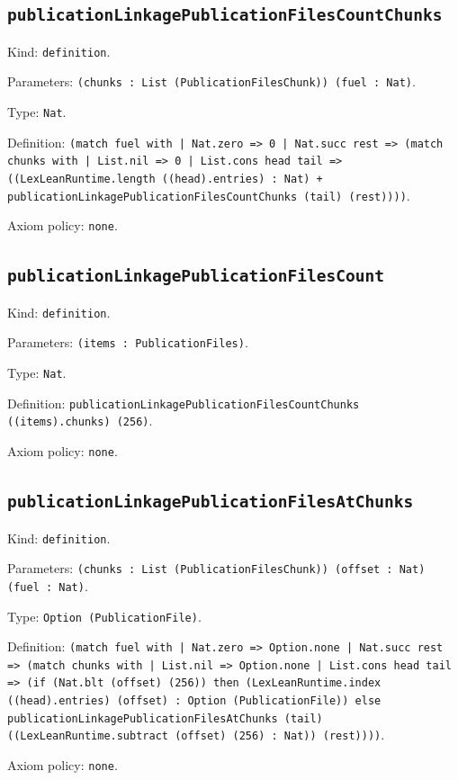 \documentclass[11pt]{article}
\begin{document}
\subsection*{\texttt{publicationLinkagePublicationFilesCountChunks}}
\noindent Kind: \texttt{definition}.\par
\noindent Parameters: \texttt{(chunks : List (PublicationFilesChunk)) (fuel : Nat)}.\par
\noindent Type: \texttt{Nat}.\par
\noindent Definition: \texttt{(match fuel with | Nat.zero => 0 | Nat.succ rest => (match chunks with | List.nil => 0 | List.cons head tail => ((LexLeanRuntime.length ((head).entries) : Nat) + publicationLinkagePublicationFilesCountChunks (tail) (rest))))}.\par
\noindent Axiom policy: \texttt{none}.\par
\subsection*{\texttt{publicationLinkagePublicationFilesCount}}
\noindent Kind: \texttt{definition}.\par
\noindent Parameters: \texttt{(items : PublicationFiles)}.\par
\noindent Type: \texttt{Nat}.\par
\noindent Definition: \texttt{publicationLinkagePublicationFilesCountChunks ((items).chunks) (256)}.\par
\noindent Axiom policy: \texttt{none}.\par
\subsection*{\texttt{publicationLinkagePublicationFilesAtChunks}}
\noindent Kind: \texttt{definition}.\par
\noindent Parameters: \texttt{(chunks : List (PublicationFilesChunk)) (offset : Nat) (fuel : Nat)}.\par
\noindent Type: \texttt{Option (PublicationFile)}.\par
\noindent Definition: \texttt{(match fuel with | Nat.zero => Option.none | Nat.succ rest => (match chunks with | List.nil => Option.none | List.cons head tail => (if (Nat.blt (offset) (256)) then (LexLeanRuntime.index ((head).entries) (offset) : Option (PublicationFile)) else publicationLinkagePublicationFilesAtChunks (tail) ((LexLeanRuntime.subtract (offset) (256) : Nat)) (rest))))}.\par
\noindent Axiom policy: \texttt{none}.\par
\end{document}
